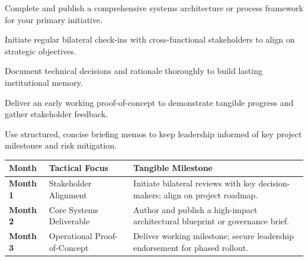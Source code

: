 \begin{diamondlist}
  \item {\fontsize{8.5}{12}\selectfont Complete and publish a comprehensive systems architecture or process framework for your primary initiative.}
  \item {\fontsize{8.5}{12}\selectfont Initiate regular bilateral check-ins with cross-functional stakeholders to align on strategic objectives.}
  \item {\fontsize{8.5}{12}\selectfont Document technical decisions and rationale thoroughly to build lasting institutional memory.}
  \item {\fontsize{8.5}{12}\selectfont Deliver an early working proof-of-concept to demonstrate tangible progress and gather stakeholder feedback.}
  \item {\fontsize{8.5}{12}\selectfont Use structured, concise briefing memos to keep leadership informed of key project milestones and risk mitigation.}
\end{diamondlist}


\begin{highlightcard}
  \sffamily\fontsize{8}{11.5}\selectfont
  \begin{tabularx}{\linewidth}{@{}l l X@{}}
    \toprule
    \textbf{Month} & \textbf{Tactical Focus} & \textbf{Tangible Milestone} \\
    \midrule
    \textbf{Month 1} & Stakeholder Alignment & Initiate bilateral reviews with key decision-makers; align on project roadmap. \\
    \textbf{Month 2} & Core Systems Deliverable & Author and publish a high-impact architectural blueprint or governance brief. \\
    \textbf{Month 3} & Operational Proof-of-Concept & Deliver working milestone; secure leadership endorsement for phased rollout. \\
    \bottomrule
  \end{tabularx}
\end{highlightcard}\vspace{2mm}

\label{topic70}

